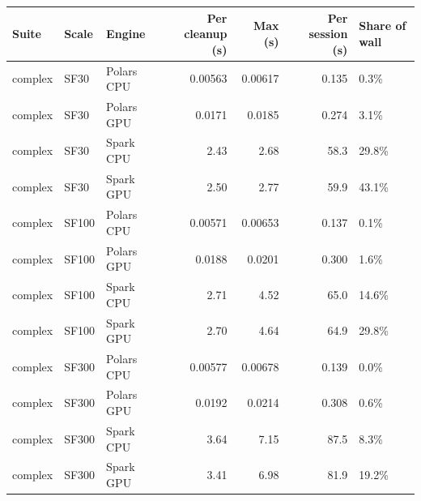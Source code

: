 \begin{tabular}{lllrrrl}
\toprule
Suite & Scale & Engine & Per cleanup (s) & Max (s) & Per session (s) & Share of wall \\
\midrule
complex & SF30 & Polars CPU & 0.00563 & 0.00617 & 0.135 & 0.3\% \\
complex & SF30 & Polars GPU & 0.0171 & 0.0185 & 0.274 & 3.1\% \\
complex & SF30 & Spark CPU & 2.43 & 2.68 & 58.3 & 29.8\% \\
complex & SF30 & Spark GPU & 2.50 & 2.77 & 59.9 & 43.1\% \\
complex & SF100 & Polars CPU & 0.00571 & 0.00653 & 0.137 & 0.1\% \\
complex & SF100 & Polars GPU & 0.0188 & 0.0201 & 0.300 & 1.6\% \\
complex & SF100 & Spark CPU & 2.71 & 4.52 & 65.0 & 14.6\% \\
complex & SF100 & Spark GPU & 2.70 & 4.64 & 64.9 & 29.8\% \\
complex & SF300 & Polars CPU & 0.00577 & 0.00678 & 0.139 & 0.0\% \\
complex & SF300 & Polars GPU & 0.0192 & 0.0214 & 0.308 & 0.6\% \\
complex & SF300 & Spark CPU & 3.64 & 7.15 & 87.5 & 8.3\% \\
complex & SF300 & Spark GPU & 3.41 & 6.98 & 81.9 & 19.2\% \\
\bottomrule
\end{tabular}
